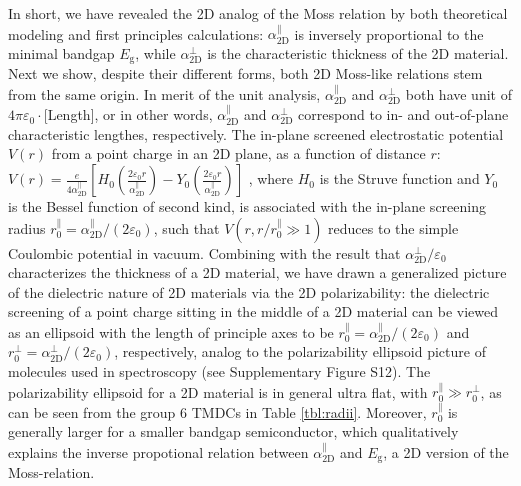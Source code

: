 \documentclass[journal=ancac3,manuscript=article,email=true,hyperref=true,keywords=false]{achemso}
\begin{document}
In short, we have revealed the 2D analog of the Moss relation by both
theoretical modeling and first principles calculations:
$\alpha_{\mathrm{2D}}^{\parallel}$ is inversely proportional to the
minimal bandgap $E_{\mathrm{g}}$, while $\alpha_{\mathrm{2D}}^{\perp}$
is the characteristic thickness of the 2D material. Next we show,
despite their different forms, both 2D Moss-like relations stem from
the same origin. In merit of the unit analysis,
$\alpha_{\mathrm{2D}}^{\parallel}$ and $\alpha_{\mathrm{2D}}^{\perp}$
both have unit of $4\pi\varepsilon_{0} \cdot$[Length], or in other
words, $\alpha_{\mathrm{2D}}^{\parallel}$ and
$\alpha_{\mathrm{2D}}^{\perp}$ correspond to in- and out-of-plane
characteristic lengthes, respectively. The in-plane screened
electrostatic potential $V(r)$ from a point charge in an 2D plane, as
a function of distance $r$:
$V(r) = {\displaystyle \frac{e}{4 \alpha_{\mathrm{2D}}^{\parallel}}}
\left[H_{0}({\displaystyle \frac{2\varepsilon_{0}
      r}{\alpha_{\mathrm{2D}}^{\parallel}}}) - Y_{0}( {\displaystyle \frac{2
      \varepsilon_{0}r}{\alpha_{\mathrm{2D}}^{\parallel}}})\right]$
\cite{Keldysh_1979_eps_multi,Pulci_2014}, where $H_{0}$ is the Struve
function and $Y_{0}$ is the Bessel function of second kind, is
associated with the in-plane screening radius
$r_{0}^{\parallel}=\alpha_{\mathrm{2D}}^{\parallel}/(2
\varepsilon_{0})$, such that $V(r,r/r^{\parallel}_{0} \gg 1)$ reduces
to the simple Coulombic potential in vacuum. Combining with the result
that $\alpha_{\mathrm{2D}}^{\perp}/\varepsilon_{0}$ characterizes the
thickness of a 2D material, we have drawn a generalized picture of the
dielectric nature of 2D materials via the 2D polarizability: the
dielectric screening of a point charge sitting in the middle of a 2D
material can be viewed as an ellipsoid with the length of principle
axes to be
$r_{0}^{\parallel} = \alpha_{\mathrm{2D}}^{\parallel}/(2
\varepsilon_{0})$ and
$r_{0}^{\perp} = \alpha^{\perp}_{\mathrm{2D}}/(2 \varepsilon_{0})$,
respectively, analog to the polarizability ellipsoid picture of
molecules used in spectroscopy \cite{Banwell_1994} (see Supplementary
Figure S12). The polarizability ellipsoid for a 2D material is in
general ultra flat, with $r_{0}^{\parallel} \gg r_{0}^{\perp}$, as
can be seen from the group 6 TMDCs in Table \ref{tbl:radii}.
Moreover, $r_{0}^{\parallel}$ is generally larger for a smaller
bandgap semiconductor, which qualitatively explains the inverse
propotional relation between $\alpha_{\mathrm{2D}}^{\parallel}$ and
$E_{\mathrm{g}}$, a 2D version of the Moss-relation.
\end{document}
